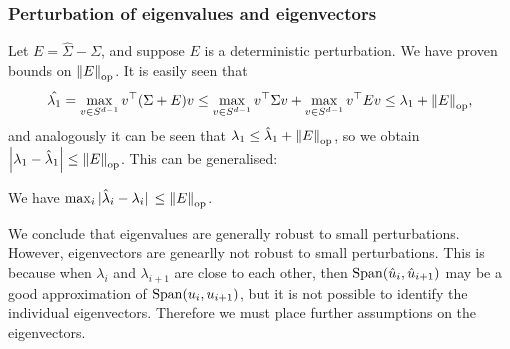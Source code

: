 \subsubsection{Perturbation of eigenvalues and eigenvectors}
Let $E = \hat\Sigma - \Sigma$, and suppose $E$ is a deterministic perturbation. We have proven bounds on $\norm{E}_\mathrm{op}$. It is easily seen that
\[
\hat{\lambda_1} = \max_{v \in S^{d-1}} v^\top (\Sigma + E)v \leq\max_{v \in S^{d-1}} v^\top \Sigma v + \max_{v \in S^{d-1}} v^\top E v  \leq \lambda_1 + \norm{E}_\mathrm{op}, 
\]
and analogously it can be seen that $\lambda_1 \leq \hat\lambda_1 + \norm{E}_\mathrm{op}$, so we obtain $\abs{\lambda_1 - \hat\lambda_1} \leq \norm{E}_\mathrm{op}$. This can be generalised:
\begin{theorem}[Weyl]
	We have $\max_i \abs*{\hat\lambda_i - \lambda_i} \leq \norm{E}_\mathrm{op}$. 
\end{theorem}

We conclude that eigenvalues are generally robust to small perturbations. However, eigenvectors are genearlly not robust to small perturbations. This is because when $\lambda_i$ and $\lambda_{i+1}$ are close to each other, then $\operatorname{Span}(\hat u_i, \hat u_{i+1})$ may be a good approximation of $\operatorname{Span}(u_i, u_{i+1})$, but it is not possible to identify the individual eigenvectors.  Therefore we must place further assumptions on the eigenvectors. 